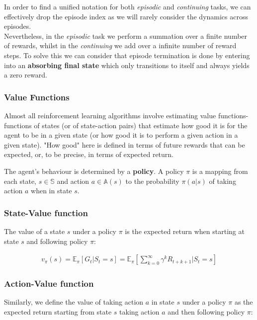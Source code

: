 \documentclass[paper=a4,fontsize=11pt]{scrartcl} %
\numberwithin{equation}{section} %
\numberwithin{figure}{section} %
\numberwithin{table}{section} %
\begin{document}
In order to find a unified notation for both \textit{episodic} and \textit{continuing}
tasks, we can effectively drop the episode index as we will rarely consider the
dynamics across episodes. \\

Nevertheless, in the \textit{episodic} task we perform a summation over a finite
number of rewards, whilst in the \textit{continuing} we add over a infinite number
of reward steps. To solve this we can consider that episode termination is done
by entering into an \textbf{absorbing final state} which only transitions to itself
and always yields a zero reward.



\subsubsection{Value Functions}

Almost all reinforcement learning algorithms involve estimating 
value functions-functions of states (or of state-action pairs) that estimate how good it
is for the agent to be in a given state (or how good it is to perform a given
action in a given state). "How good" here is defined in terms of future rewards that can be expected, or, to be precise, in terms of expected return.

The agent's behaviour is determined by a \textbf{policy}.
A policy $\pi$ is a mapping from each state, $s \in \mathbb{S}$ and action $a \in \mathbb{A}(s)$ to the probability $\pi(a|s)$ of taking
action $a$ when in state $s$. \\

\subsubsection{State-Value function}
The value of a state $s$ under a policy $\pi$ is the expected return
when starting at state $s$ and following policy $\pi$:

\begin{align}
    v_{\pi}(s) = \mathbb{E}_{\pi} \left[ G_t | S_t=s \right] = 
    \mathbb{E}_{\pi} \left[ \sum_{k=0}^{\infty} \gamma^k R_{t+k+1} | S_t=s \right]
    \label{eq:value_function}
\end{align}

\subsubsection{Action-Value function}
Similarly, we define the value of taking action $a$ in state $s$ under a policy
$\pi$ as the expected return starting from state $s$ taking action $a$
and then following policy $\pi$:
\end{document}
